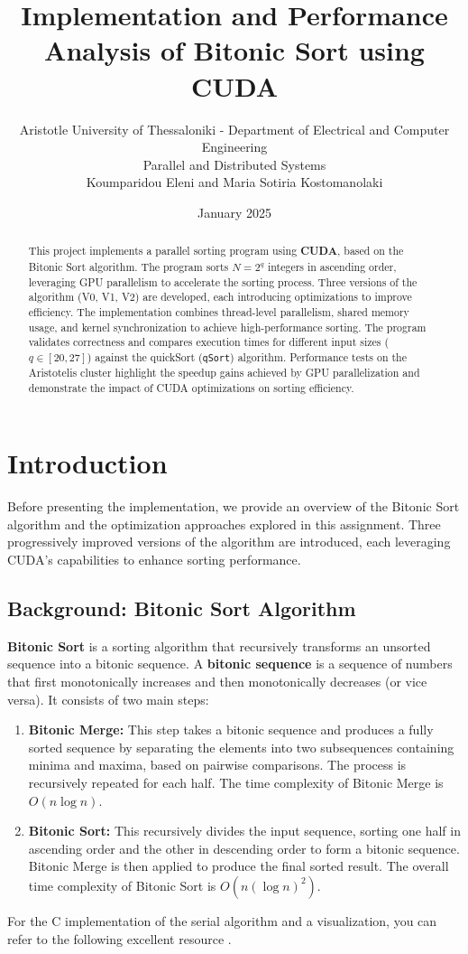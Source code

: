 \documentclass[a4paper,12pt]{article}
\title{Implementation and Performance Analysis of Bitonic Sort using CUDA}
\author{
    \small Aristotle University of Thessaloniki - Department of Electrical and Computer Engineering \\[0.5em]
    \small Parallel and Distributed Systems\\[1.5em]
    Koumparidou Eleni and Maria Sotiria Kostomanolaki \\[1em]
}
\date{January 2025}
\begin{document}
\maketitle

\begin{abstract}
This project implements a parallel sorting program using \textbf{CUDA}, based on the Bitonic Sort algorithm. The program sorts $N = 2^q$ integers in ascending order, leveraging GPU parallelism to accelerate the sorting process. Three versions of the algorithm (V0, V1, V2) are developed, each introducing optimizations to improve efficiency. The implementation combines thread-level parallelism, shared memory usage, and kernel synchronization to achieve high-performance sorting. The program validates correctness and compares execution times for different input sizes ($q \in [20, 27]$) against the quickSort (\texttt{qSort}) algorithm. Performance tests on the Aristotelis cluster highlight the speedup gains achieved by GPU parallelization and demonstrate the impact of CUDA optimizations on sorting efficiency.
\end{abstract}

\tableofcontents
\newpage

\section{Introduction}
Before presenting the implementation, we provide an overview of the Bitonic Sort algorithm and the optimization approaches explored in this assignment. Three progressively improved versions of the algorithm are introduced, each leveraging CUDA's capabilities to enhance sorting performance.


\subsection{Background: Bitonic Sort Algorithm}  
\textbf{Bitonic Sort} is a sorting algorithm that recursively transforms an unsorted sequence into a bitonic sequence. A \textbf{bitonic sequence} is a sequence of numbers that first monotonically increases and then monotonically decreases (or vice versa). It consists of two main steps: 
\begin{enumerate}
 \item \textbf{Bitonic Merge:} This step takes a bitonic sequence and produces a fully sorted sequence by separating the elements into two subsequences containing minima and maxima, based on pairwise comparisons. The process is recursively repeated for each half. The time complexity of Bitonic Merge is \(O(n \log n)\).  

\item \textbf{Bitonic Sort:} This recursively divides the input sequence, sorting one half in ascending order and the other in descending order to form a bitonic sequence. Bitonic Merge is then applied to produce the final sorted result. The overall time complexity of Bitonic Sort is \(O(n (\log n)^2)\).  
\end{enumerate}
For the C implementation of the serial algorithm and a visualization, you can refer to the following excellent resource \cite{sortvisualizer}.
\end{document}
